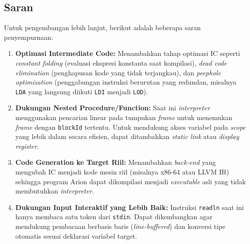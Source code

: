 \documentclass[12pt, a4paper]{article}
\begin{document}
\subsection{Saran}
Untuk pengembangan lebih lanjut, berikut adalah beberapa saran penyempurnaan:
\begin{enumerate}
    \item \textbf{Optimasi Intermediate Code:} Menambahkan tahap optimasi IC seperti \textit{constant folding} (evaluasi ekspresi konstanta saat kompilasi), \textit{dead code elimination} (penghapusan kode yang tidak terjangkau), dan \textit{peephole optimization} (penggabungan instruksi berurutan yang redundan, misalnya \texttt{LDA} yang langsung diikuti \texttt{LDI} menjadi \texttt{LOD}).
    \item \textbf{Dukungan Nested Procedure/Function:} Saat ini \textit{interpreter} menggunakan pencarian linear pada tumpukan \textit{frame} untuk menemukan \textit{frame} dengan \texttt{blockId} tertentu. Untuk mendukung akses variabel pada \textit{scope} yang lebih dalam secara efisien, dapat ditambahkan \textit{static link} atau \textit{display register}.
    \item \textbf{Code Generation ke Target Riil:} Menambahkan \textit{back-end} yang mengubah IC menjadi kode mesin riil (misalnya x86-64 atau LLVM IR) sehingga program Arion dapat dikompilasi menjadi \textit{executable} asli yang tidak membutuhkan \textit{interpreter}.
    \item \textbf{Dukungan Input Interaktif yang Lebih Baik:} Instruksi \texttt{readln} saat ini hanya membaca satu token dari \texttt{stdin}. Dapat dikembangkan agar mendukung pembacaan berbasis baris (\textit{line-buffered}) dan konversi tipe otomatis sesuai deklarasi variabel target.
\end{enumerate}
\end{document}
